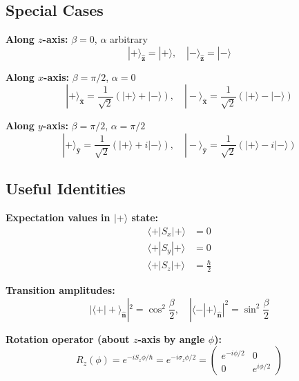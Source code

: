 \documentclass[11pt,a4paper]{article}
\begin{document}
\subsection{Special Cases}

\textbf{Along $z$-axis:} $\beta = 0$, $\alpha$ arbitrary
\begin{equation}
|+\rangle_{\hat{\mathbf{z}}} = |+\rangle, \quad |-\rangle_{\hat{\mathbf{z}}} = |-\rangle
\tag{S.33}
\end{equation}

\textbf{Along $x$-axis:} $\beta = \pi/2$, $\alpha = 0$
\begin{equation}
|+\rangle_{\hat{\mathbf{x}}} = \frac{1}{\sqrt{2}}(|+\rangle + |-\rangle), \quad
|-\rangle_{\hat{\mathbf{x}}} = \frac{1}{\sqrt{2}}(|+\rangle - |-\rangle)
\tag{S.34}
\end{equation}

\textbf{Along $y$-axis:} $\beta = \pi/2$, $\alpha = \pi/2$
\begin{equation}
|+\rangle_{\hat{\mathbf{y}}} = \frac{1}{\sqrt{2}}(|+\rangle + i|-\rangle), \quad
|-\rangle_{\hat{\mathbf{y}}} = \frac{1}{\sqrt{2}}(|+\rangle - i|-\rangle)
\tag{S.35}
\end{equation}

\subsection{Useful Identities}

\textbf{Expectation values in $|+\rangle$ state:}
\begin{align}
\langle +|S_x|+\rangle &= 0 \tag{S.36a} \\
\langle +|S_y|+\rangle &= 0 \tag{S.36b} \\
\langle +|S_z|+\rangle &= \frac{\hbar}{2} \tag{S.36c}
\end{align}

\textbf{Transition amplitudes:}
\begin{equation}
|\langle +|+\rangle_{\hat{\mathbf{n}}}|^2 = \cos^2\frac{\beta}{2}, \quad
|\langle -|+\rangle_{\hat{\mathbf{n}}}|^2 = \sin^2\frac{\beta}{2}
\tag{S.37}
\end{equation}

\textbf{Rotation operator (about $z$-axis by angle $\phi$):}
\begin{equation}
R_z(\phi) = e^{-iS_z\phi/\hbar} = e^{-i\sigma_z\phi/2} = \begin{pmatrix}
e^{-i\phi/2} & 0 \\
0 & e^{i\phi/2}
\end{pmatrix}
\tag{S.38}
\end{equation}
\end{document}
